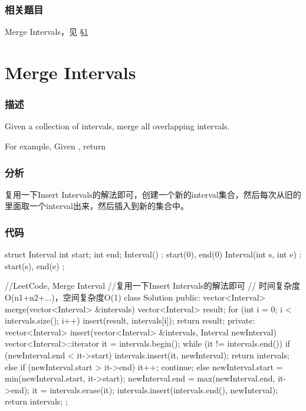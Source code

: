 \subsubsection{相关题目}

\begindot
\item Merge Intervals，见 \S \ref{sec:merge-intervals}
\myenddot


\section{Merge Intervals} %
\label{sec:merge-intervals}


\subsubsection{描述}
Given a collection of intervals, merge all overlapping intervals.

For example,
Given \code{[1,3],[2,6],[8,10],[15,18]},
return \code{[1,6],[8,10],[15,18]}


\subsubsection{分析}
复用一下Insert Intervals的解法即可，创建一个新的interval集合，然后每次从旧的里面取一个interval出来，然后插入到新的集合中。


\subsubsection{代码}
\begin{Code}
struct Interval {
    int start;
    int end;
    Interval() : start(0), end(0) { }
    Interval(int s, int e) : start(s), end(e) { }
};
 
//LeetCode, Merge Interval
//复用一下Insert Intervals的解法即可
// 时间复杂度O(n1+n2+...)，空间复杂度O(1)
class Solution {
public:
    vector<Interval> merge(vector<Interval> &intervals) {
        vector<Interval> result;
        for (int i = 0; i < intervals.size(); i++) {
            insert(result, intervals[i]);
        }
        return result;
    }
private:
    vector<Interval> insert(vector<Interval> &intervals, Interval newInterval) {
        vector<Interval>::iterator it = intervals.begin();
        while (it != intervals.end()) {
            if (newInterval.end < it->start) {
                intervals.insert(it, newInterval);
                return intervals;
            } else if (newInterval.start > it->end) {
                it++;
                continue;
            } else {
                newInterval.start = min(newInterval.start, it->start);
                newInterval.end = max(newInterval.end, it->end);
                it = intervals.erase(it);
            }
        }
        intervals.insert(intervals.end(), newInterval);
        return intervals;
    }
};
\end{Code}


